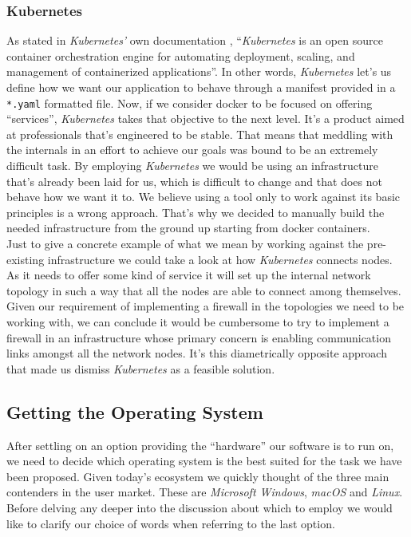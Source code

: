             \subsubsection{Kubernetes}
                As stated in \textit{Kubernetes'} own documentation \cite{bib:kubernetes-doc}, ``\textit{Kubernetes} is an open source container orchestration engine for automating deployment, scaling, and management of containerized applications''. In other words, \textit{Kubernetes} let's us define how we want our application to behave through a manifest provided in a \texttt{*.yaml} formatted file. Now, if we consider docker to be focused on offering ``services'', \textit{Kubernetes} takes that objective to the next level. It's a product aimed at professionals that's engineered to be stable. That means that meddling with the internals in an effort to achieve our goals was bound to be an extremely difficult task. By employing \textit{Kubernetes} we would be using an infrastructure that's already been laid for us, which is difficult to change and that does not behave how we want it to. We believe using a tool only to work against its basic principles is a wrong approach. That's why we decided to manually build the needed infrastructure from the ground up starting from docker containers.\\

                Just to give a concrete example of what we mean by working against the pre-existing infrastructure we could take a look at how \textit{Kubernetes} connects nodes. As it needs to offer some kind of service it will set up the internal network topology in such a way that all the nodes are able to connect among themselves. Given our requirement of implementing a firewall in the topologies we need to be working with, we can conclude it would be cumbersome to try to implement a firewall in an infrastructure whose primary concern is enabling communication links amongst all the network nodes. It's this diametrically opposite approach that made us dismiss \textit{Kubernetes} as a feasible solution.\\

        \subsection{Getting the Operating System}
            After settling on an option providing the ``hardware'' our software is to run on, we need to decide which operating system is the best suited for the task we have been proposed. Given today's ecosystem we quickly thought of the three main contenders in the user market. These are \textit{Microsoft Windows}, \textit{macOS} and \textit{Linux}. Before delving any deeper into the discussion about which to employ we would like to clarify our choice of words when referring to the last option.\\

